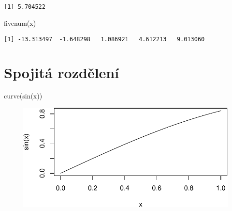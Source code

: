 \documentclass[
  letterpaper,
  DIV=11,
  numbers=noendperiod]{scrreprt}
\newenvironment{Shaded}{\begin{snugshade}}{\end{snugshade}}
\newcommand{\FunctionTok}[1]{\textcolor[rgb]{0.28,0.35,0.67}{#1}}
\newcommand{\NormalTok}[1]{\textcolor[rgb]{0.00,0.23,0.31}{#1}}
\begin{document}
\begin{verbatim}
[1] 5.704522
\end{verbatim}

\begin{Shaded}
\begin{Highlighting}[]
\FunctionTok{fivenum}\NormalTok{(x)}
\end{Highlighting}
\end{Shaded}

\begin{verbatim}
[1] -13.313497  -1.648298   1.086921   4.612213   9.013060
\end{verbatim}

\hypertarget{spojituxe1-rozdux11blenuxed}{%
\section{Spojitá rozdělení}\label{spojituxe1-rozdux11blenuxed}}

\begin{Shaded}
\begin{Highlighting}[]
\FunctionTok{curve}\NormalTok{(}\FunctionTok{sin}\NormalTok{(x))}
\end{Highlighting}
\end{Shaded}

\begin{figure}[H]

{\centering \includegraphics{05_rozdeleni_files/figure-pdf/unnamed-chunk-7-1.pdf}

}

\end{figure}
\end{document}
